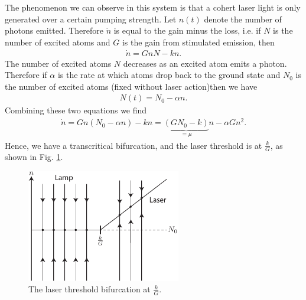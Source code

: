 \begin{enumerate}
\begin{ex}
		The phenomenon we can observe in this system is that a cohert laser light is only generated over a certain pumping strength. Let $n(t)$ denote the number of photons emitted. Therefore $\dot{n}$ is equal to the gain minus the loss, i.e. if $N$ is the number of excited atoms and $G$ is the gain from stimulated emission, then 
		\begin{align}
			\dot{n} = GnN - kn.
		\end{align}
		The number of excited atoms $N$ decreases as an excited atom emits a photon. Therefore if $\alpha $ is the rate at which atoms drop back to the ground state and $N_0$ is the number of excited atoms (fixed without laser action)then we have 
		\begin{align}
			N(t) = N_0 - \alpha n.
		\end{align}
		Combining these two equations we find
		\begin{align}
			\dot{n} = Gn(N_0 - \alpha n) - kn = \underbrace{(GN_0 - k)}_{= \mu } n - \alpha Gn^2.
		\end{align}
		Hence, we have a transcritical bifurcation, and the laser threshold is at $\frac{k}{G}$, as shown in Fig. \ref{fig:laser_threshold_bif}.
		\begin{figure}[h!]
			\centering
			\includegraphics[width=0.6\textwidth]{figures/ch3/15laser_threshold_bif.pdf}
			\caption{The laser threshold bifurcation at $\frac{k}{G}$.}
			\label{fig:laser_threshold_bif}
		\end{figure}
	\end{ex}
	

\end{enumerate}
